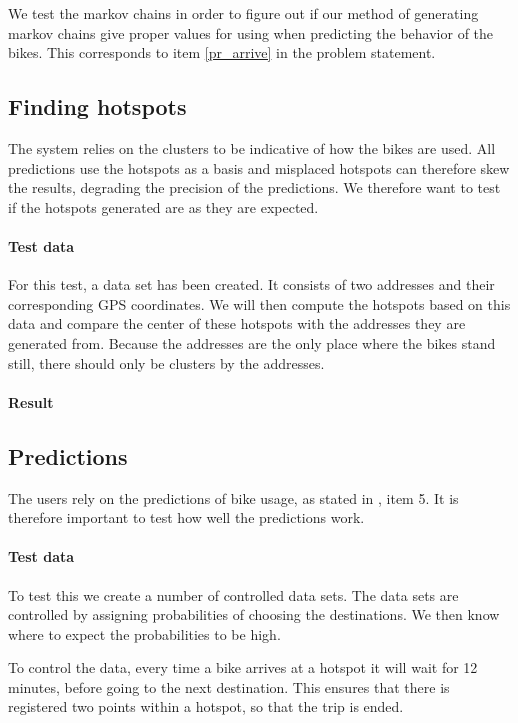 We test the markov chains in order to figure out if our method of generating markov chains give proper values for using when predicting the behavior of the bikes.
This corresponds to item \ref{pr_arrive} in the problem statement.

\subsection{Finding hotspots}
The system relies on the clusters to be indicative of how the bikes are used. 
All predictions use the hotspots as a basis and misplaced hotspots can therefore skew the results, degrading the precision of the predictions.
We therefore want to test if the hotspots generated are as they are expected.

\paragraph{Test data}
For this test, a data set has been created.
It consists of two addresses and their corresponding GPS coordinates.
We will then compute the hotspots based on this data and compare the center of these hotspots with the addresses they are generated from.
Because the addresses are the only place where the bikes stand still, there should only be clusters by the addresses.

\paragraph{Result}

\subsection{Predictions}
The users rely on the predictions of bike usage, as stated in , item 5.
It is therefore important to test how well the predictions work.

\paragraph{Test data} To test this we create a number of controlled data sets.
The data sets are controlled by assigning probabilities of choosing the destinations. 
We then know where to expect the probabilities to be high.

To control the data, every time a bike arrives at a hotspot it will wait for 12 minutes, before going to the next destination.
This ensures that there is registered two points within a hotspot, so that the trip is ended.

